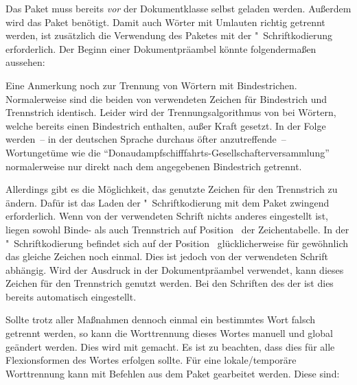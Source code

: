 Das Paket  muss bereits \emph{vor} der Dokumentklasse selbst 
geladen werden. Außerdem wird das Paket  benötigt. Damit auch 
Wörter mit Umlauten richtig getrennt werden, ist zusätzlich die Verwendung des 
Paketes  mit der "~Schriftkodierung erforderlich. 
Der Beginn einer Dokumentpräambel könnte folgendermaßen aussehen:
%
\begin{quoting}[rightmargin=0pt]
\end{quoting}
%
Eine Anmerkung noch zur Trennung von Wörtern mit Bindestrichen. Normalerweise 
sind die beiden von  verwendeten Zeichen für Bindestrich und 
Trennstrich identisch. Leider wird der Trennungsalgorithmus von  
bei Wörtern, welche bereits einen Bindestrich enthalten, außer Kraft gesetzt. 
In der Folge werden~-- in der deutschen Sprache durchaus öfter anzutreffende~-- 
Wortungetüme wie die \enquote{Donaudampfschifffahrts-Gesellschafterversammlung} 
normalerweise nur direkt nach dem angegebenen Bindestrich getrennt. 

Allerdings gibt es die Möglichkeit, das genutzte Zeichen für den Trennstrich 
zu ändern. Dafür ist das Laden der "~Schriftkodierung mit dem Paket 
 zwingend erforderlich. Wenn von der verwendeten Schrift 
nichts anderes eingestellt ist, liegen sowohl Binde- als auch Trennstrich auf 
Position~ der Zeichentabelle. In der "~Schriftkodierung 
befindet sich auf der Position~ glücklicherweise für gewöhnlich das 
gleiche Zeichen noch einmal. Dies ist jedoch von der verwendeten Schrift 
abhängig. Wird der Ausdruck  in der 
Dokumentpräambel verwendet, kann dieses Zeichen für den Trennstrich genutzt 
werden. Bei den Schriften des \CDs der \TnUD ist dies bereits automatisch 
eingestellt.

Sollte trotz aller Maßnahmen dennoch einmal ein bestimmtes Wort falsch getrennt 
werden, so kann die Worttrennung dieses Wortes manuell und global geändert 
werden. Dies wird mit  
gemacht. Es ist zu beachten, dass dies für alle Flexionsformen des Wortes 
erfolgen sollte. Für eine lokale/temporäre Worttrennung kann mit Befehlen aus 
dem Paket  gearbeitet werden. Diese sind: 

